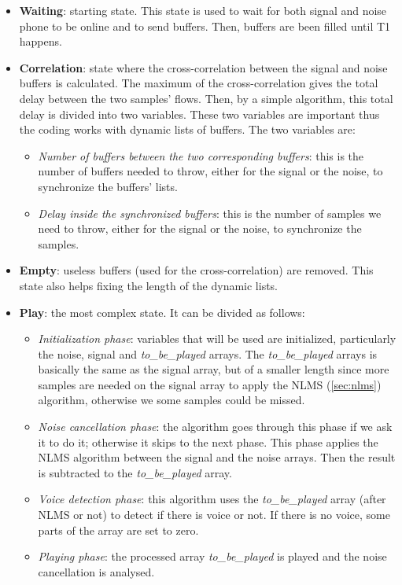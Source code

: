 \documentclass[11pt,a4paper,english]{book}  %
\theoremstyle{definition}  %
\theoremstyle{plain}  %
\theoremstyle{remark}  %
\begin{document}
	\begin{itemize}
	\item \textbf{Waiting}: starting state. This state is used to wait for both signal and noise phone to be online and to send buffers. Then, buffers are been filled until T1 happens.
	
	\item \textbf{Correlation}: state where the cross-correlation between the signal and noise buffers is calculated. The maximum of the cross-correlation gives the total delay between the two samples’ flows. Then, by a simple algorithm, this total delay is divided into two variables. These two variables are important thus the coding works with dynamic lists of buffers. The two variables are:
	
		\begin{itemize}
		\item \textit{Number of buffers between the two corresponding buffers}: this is the number of buffers needed to throw, either for the signal or the noise, to synchronize the buffers' lists.
		\item  \textit{Delay inside the synchronized buffers}: this is the number of samples we need to throw, either for the signal or the noise, to synchronize the samples.
		\end{itemize}
		
	\item \textbf{Empty}: useless buffers (used for the cross-correlation) are removed. This state also helps fixing the length of the dynamic lists.
	
	\item \textbf{Play}: the most complex state. It can be divided as follows:
	
		\begin{itemize}
		\item \textit{Initialization phase}: variables that will be used are initialized, particularly the noise, signal and \textit{to\_be\_played} arrays. The \textit{to\_be\_played} arrays is basically the same as the signal array,  but of a smaller length since more samples are needed on the signal array to apply the NLMS (\ref{sec:nlms}) algorithm, otherwise we some samples could be missed.
		
		\item \textit{Noise cancellation phase}: the algorithm goes through this phase if we ask it to do it; otherwise it skips to the next phase. This phase applies the NLMS algorithm between the signal and the noise arrays. Then the result is subtracted to the \textit{to\_be\_played} array.
		
		\item \textit{Voice detection phase}: this algorithm uses the \textit{to\_be\_played} array (after NLMS or not) to detect if there is voice or not. If there is no voice, some parts of the array are set to zero.
		\item \textit{Playing phase}: the processed array \textit{to\_be\_played} is played and the noise cancellation is analysed.
		\end{itemize}
		
		
	\end{itemize}
		
\end{document}
